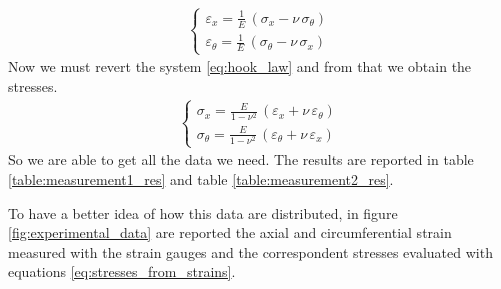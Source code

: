 \documentclass[a4paper,12pt]{article}
\begin{document}
\begin{align}
\begin{cases}{}
\varepsilon_{x} 	 = \frac{1}{E}\, (\sigma_{x} - \nu \, \sigma_{\theta}) \\[0.5em]
\varepsilon_{\theta} = \frac{1}{E}\, (\sigma_{\theta} - \nu \, \sigma_{x})
\end{cases}
\label{eq:hook_law}
\end{align}
%
Now we must revert the system \ref{eq:hook_law} and from that we obtain the stresses.
%
\begin{align}
\begin{cases}{}
\sigma_{x} 	 = \frac{E}{1-\nu^2} \, (\varepsilon_{x} + \nu \, \varepsilon_{\theta}) \\[0.5em]
\sigma_{\theta} = \frac{E}{1-\nu^2} \, (\varepsilon_{\theta} + \nu \, \varepsilon_{x})
\end{cases}
\label{eq:stresses_from_strains}
\end{align}
%
So we are able to get all the data we need. The results are reported in table \ref{table:measurement1_res} and table \ref{table:measurement2_res}.

To have a better idea of how this data are distributed, in figure \ref{fig:experimental_data} are reported the axial and circumferential strain measured with the strain gauges and the correspondent stresses evaluated with equations \ref{eq:stresses_from_strains}.
\end{document}
